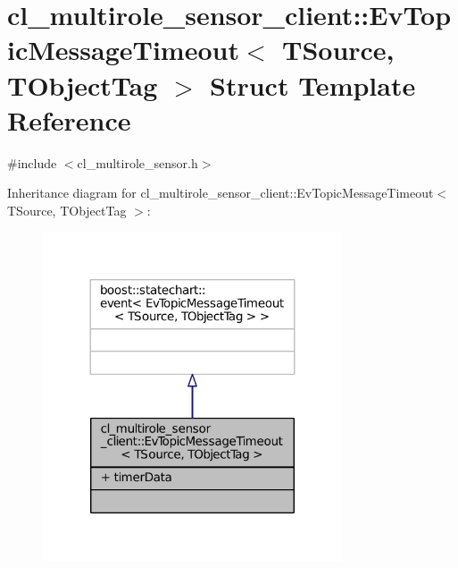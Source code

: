 \hypertarget{structcl__multirole__sensor__client_1_1EvTopicMessageTimeout}{}\section{cl\+\_\+multirole\+\_\+sensor\+\_\+client\+:\+:Ev\+Topic\+Message\+Timeout$<$ T\+Source, T\+Object\+Tag $>$ Struct Template Reference}
\label{structcl__multirole__sensor__client_1_1EvTopicMessageTimeout}


{\ttfamily \#include $<$cl\+\_\+multirole\+\_\+sensor.\+h$>$}



Inheritance diagram for cl\+\_\+multirole\+\_\+sensor\+\_\+client\+:\+:Ev\+Topic\+Message\+Timeout$<$ T\+Source, T\+Object\+Tag $>$\+:
\nopagebreak
\begin{figure}[H]
\begin{center}
\leavevmode
\includegraphics[width=251pt]{structcl__multirole__sensor__client_1_1EvTopicMessageTimeout__inherit__graph}
\end{center}
\end{figure}


